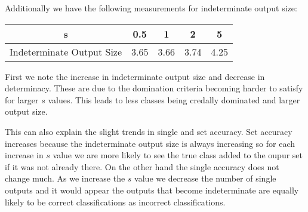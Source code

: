 
Additionally we have the following measurements for indeterminate output size:
\begin{center}
\begin{tabular}{c|c c c c}
s & 0.5 & 1 & 2 & 5 \\
\hline
Indeterminate Output Size & 3.65 & 3.66 & 3.74 & 4.25
\end{tabular}
\end{center}

First we note the increase in indeterminate output size and decrease in determinacy.
These are due to the domination criteria becoming harder to satisfy for larger $s$ values.
This leads to less classes being credally dominated and larger output size.

This can also explain the slight trends in single and set accuracy.
Set accuracy increases because the indeterminate output size is always increasing so for each increase in $s$ value we are more likely to see the true class added to the oupur set if it was not already there.
On the other hand the single accuracy does not change much.
As we increase the $s$ value we decrease the number of single outputs and it would appear the outputs that become indeterminate are equally likely to be correct classifications as incorrect classifications.

